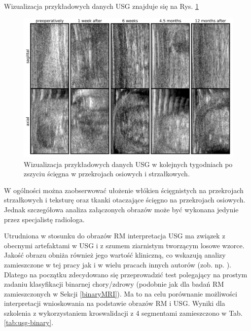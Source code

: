 Wizualizacja przykładowych danych USG znajduje się na Rys. \ref{fig:US_sample}
\begin{figure}[h!]
	\includegraphics[width=\textwidth]{figures/Data_US_sample.png}
	\caption{Wizualizacja przykładowych danych USG w kolejnych tygodniach po zszyciu ścięgna w przekrojach osiowych i strzałkowych.}
	\label{fig:US_sample}
\end{figure}

W ogólności można zaobserwować ułożenie włókien ścięgnistych na przekrojach strzałkowych i teksturę oraz tkanki otaczające ścięgno na przekrojach osiowych. Jednak szczegółowa analiza załączonych obrazów może być wykonana jedynie przez specjalistę radiologa. 

Utrudniona w stosunku do obrazów RM interpretacja USG ma związek z obecnymi artefaktami w USG i z szumem ziarnistym tworzącym losowe wzorce. Jakość obrazu obniża również jego wartość kliniczną, co wskazują analizy zamieszczone w tej pracy jak i w wielu pracach innych autorów (zob. np. \cite{Khan2003, Ibrahim2013}). Dlatego na początku zdecydowano się przeprowadzić test polegający na prostym zadaniu klasyfikacji binarnej chory/zdrowy (podobnie jak dla badań RM zamieszczonych w Sekcji \ref{binaryMRI}). Ma to na celu porównanie możliwości interpretacji wnioskowania na podstawie obrazów RM i USG. Wyniki dla szkolenia z wykorzystaniem kroswalidacji z 4 segmentami zamieszczono w Tab. \ref{tab:usg-binary}.


